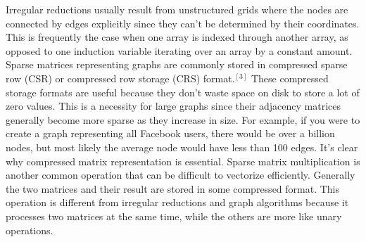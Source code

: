 \documentclass[conference]{IEEEtran}
\begin{document}
Irregular reductions usually result from unstructured grids where the nodes are connected by edges explicitly since they can't be determined by their coordinates.  This is frequently the case when one array is indexed through another array, as opposed to one induction variable iterating over an array by a constant amount.  Sparse matrices representing graphs are commonly stored in compressed sparse row (CSR) or compressed row storage (CRS) format.$^{[3]}$  These compressed storage formats are useful because they don't waste space on disk to store a lot of zero values.  This is a necessity for large graphs since their adjacency matrices generally become more sparse as they increase in size.  For example, if you were to create a graph representing all Facebook users, there would be over a billion nodes, but most likely the average node would have less than 100 edges.  It's clear why compressed matrix representation is essential.  Sparse matrix multiplication is another common operation that can be difficult to vectorize efficiently.  Generally the two matrices and their result are stored in some compressed format.  This operation is different from irregular reductions and graph algorithms because it processes two matrices at the same time, while the others are more like unary operations.  
\end{document}
